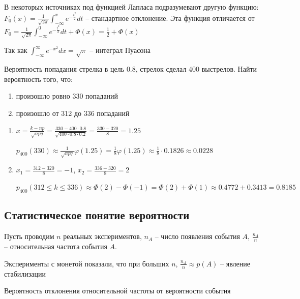 \documentclass[12pt]{article}
\begin{document}
    \Nota В некоторых источниках под функцией Лапласа подразумевают другую функцию: $F_0(x) = \frac{1}{\sqrt{2\pi}} \int_{-\infty}^x e^{-\frac{t^2}{2}}dt$ -- стандартное отклонение. Эта функция
    отличается от $F_0 = \frac{1}{\sqrt{2\pi}} \int_{-\infty}^0 e^{-\frac{t^2}{2}}dt + \Phi(x) = \frac{1}{2} + \Phi(x)$

    Так как $\int_{-\infty}^{\infty} e^{-x^2} dx = \sqrt{\pi}$ -- интеграл Пуасона

    \Ex Вероятность попадания стрелка в цель $0.8$, стрелок сделал 400 выстрелов. Найти вероятность того, что:

    \begin{enumerate}
        \item произошло ровно 330 попаданий

        \item произошло от 312 до 336 попаданий
    \end{enumerate}

    \begin{enumerate}
        \item $x = \frac{k - np}{\sqrt{npq}} = \frac{330 - 400 \cdot 0.8}{\sqrt{400 \cdot 0.8 \cdot 0.2}} = \frac{330 - 320}{8} = 1.25$

        $p_{400}(330) \approx \frac{1}{\sqrt{npq}} \varphi(1.25) = \frac{1}{8} \varphi(1.25) \approx \frac{1}{8} \cdot 0.1826 \approx 0.0228$

        \item $x_1 = \frac{312 - 320}{8} = -1$, $x_2 = \frac{336 - 320}{8} = 2$

        $p_{400}(312 \leq k \leq 336) \approx \Phi(2) - \Phi(-1) = \Phi(2) + \Phi(1) \approx 0.4772 + 0.3413 = 0.8185$
    \end{enumerate}

    \subsection{Статистическое понятие вероятности}

    Пусть проводим $n$ реальных экспериментов, $n_A$ -- число появления события $A$, $\frac{n_A}{n}$ -- относительная частота события $A$.

    Эксперименты с монетой показали, что при больших $n$, $\frac{n_A}{n} \approx p(A)$ -- явление стабилизации

    \hypertarget{probabilityofdeviation}{}

    Вероятность отклонения относительной частоты от вероятности события
\end{document}
